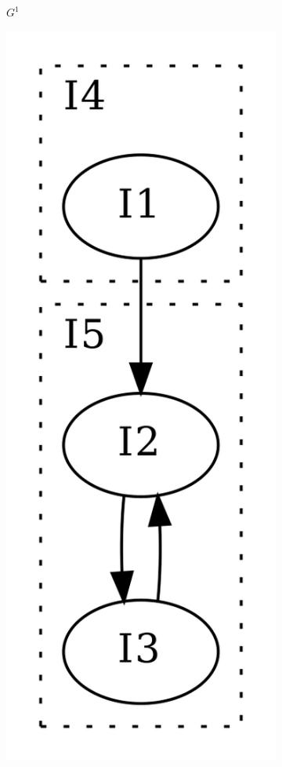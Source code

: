 \begin{figure}[htbp]
\begin{subfigure}[b]{0.30\textwidth}
		\caption{$G^1$}
	\end{subfigure}
	\qquad
	\begin{subfigure}[b]{0.12\textwidth}
		\centering
		\includegraphics[width=\textwidth]{inc/3_background/interval_method/derived_sequence_of_graphs/G_2.png}

\end{subfigure}
\end{figure}
